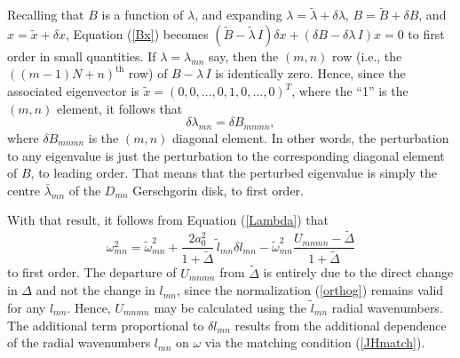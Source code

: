 \documentclass[12pt]{iopart}
\begin{document}
Recalling that $B$ is a function of $\lambda$, and expanding $\lambda=\tilde\lambda+\delta\lambda$, $B=\tilde B+\delta B$, and $x=\tilde x+\delta x$, Equation (\ref{Bx}) becomes $(\tilde B-\tilde\lambda\, I)\delta x+(\delta B-\delta\lambda\,I)x=0$ to first order in small quantities. If $\lambda=\lambda_{mn}$ say, then the $(m,n)$ row (i.e., the $((m-1)N+n)^\text{th}$ row) of $B-\lambda\, I$ is identically zero. Hence, since the associated eigenvector is $\tilde x=(0,0,\ldots,0,1,0,\ldots,0)^T$, where the ``1'' is the $(m,n)$ element, it follows that
\begin{equation}
\delta\lambda_{mn} = \delta B_{mnmn},
\end{equation}
where $\delta B_{mnmn}$ is the $(m,n)$ diagonal element. In other words, the perturbation to any eigenvalue is just the perturbation to the corresponding diagonal element of $B$, to leading order. That means that the perturbed eigenvalue is simply the centre $\bar\lambda_{mn}$ of the $D_{mn}$ Gerschgorin disk, to first order.

With that result, it follows from Equation (\ref{Lambda}) that
\begin{equation}
\omega_{mn}^2 = \tilde\omega_{mn}^2 + \frac{2a_0^2}{1+\tilde\Delta}\,\tilde l_{mn}\delta l_{mn}-\tilde\omega_{mn}^2\frac{U_{mnmn}-\tilde\Delta}{1+\tilde\Delta}  \label{omega pert}
\end{equation}
to first order. The departure of $U_{mnmn}$ from $\tilde\Delta$ is entirely due to the direct change in $\Delta$ and not the change in $l_{mn}$, since the normalization (\ref{orthog}) remains valid for any $l_{mn}$. Hence, $U_{mnmn}$ may be calculated using the $\tilde l_{mn}$ radial wavenumbers. The additional term proportional to $\delta l_{mn}$ results from the additional dependence of the radial wavenumbers $l_{mn}$ on $\omega$ via the matching condition (\ref{JHmatch}).
\end{document}
